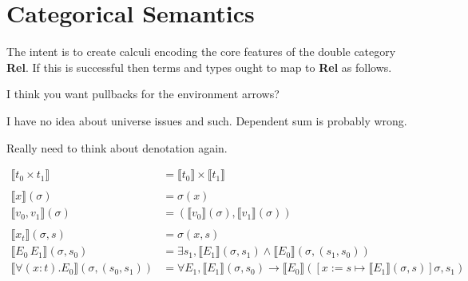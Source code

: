 \documentclass{scrartcl}
\newcommand{\Rel}{\textbf{Rel}}
\newcommand{\sat}{\mathbin{\otimes}}
\def\fCenter{\mathrel{\vdash}}
\newcommand{\update}{\mathbin{:=}}
\begin{document}
\section*{Categorical Semantics}

The intent is to create calculi encoding the core features of the
double category \Rel{}.  If this is successful then terms and types
ought to map to \Rel{} as follows.

I think you want pullbacks for the environment arrows?

\begin{center}
\end{center}

I have no idea about universe issues and such. Dependent sum is probably wrong.

Really need to think about denotation again.

\[
\begin{aligned}
  \llbracket t_0 \times t_1 \rrbracket & =\llbracket t_0 \rrbracket \times \llbracket t_1 \rrbracket \\
  \\
  \llbracket x \rrbracket(\sigma) & = \sigma(x) \\
  \llbracket v_0 , v_1 \rrbracket(\sigma) & =( \llbracket v_0 \rrbracket(\sigma) , \llbracket v_1 \rrbracket(\sigma) ) \\
  \\
  \llbracket x_t \rrbracket(\sigma, s) & = \sigma(x, s) \\
  \llbracket E_0 \, E_1 \rrbracket(\sigma, s_0) & = \exists s_1,  \llbracket E_1 \rrbracket (\sigma, s_1) \wedge \llbracket E_0 \rrbracket (\sigma, (s_1, s_0))\\
  \llbracket \forall (x \colon t). E_0 \rrbracket(\sigma, (s_0, s_1)) & = \forall E_1, \llbracket E_1 \rrbracket (\sigma, s_0) \rightarrow \llbracket E_0 \rrbracket ([x \update  s \mapsto \llbracket E_1 \rrbracket(\sigma, s)] \sigma, s_1) 
\end{aligned}
\]
\end{document}
